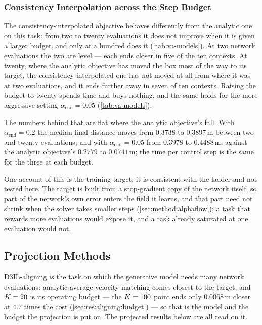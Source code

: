 \subsubsection{Consistency Interpolation across the Step Budget}\label{sec:res:aligning:consistency}

The consistency-interpolated objective behaves differently from the analytic one on this task: from two to twenty
evaluations it does not improve when it is given a larger budget, and only at a hundred does it
(\autoref{tab:va-models}). At two network evaluations the two are level --- each ends
closer in five of the ten contexts. At twenty, where the analytic objective has moved the box most of the
way to its target, the consistency-interpolated one has not moved at all from where it was at two
evaluations, and it ends further away in seven of ten contexts. Raising the budget to twenty spends time and buys
nothing, and the same holds for the more aggressive setting $\alpha_{\mathrm{end}}=0.05$
(\autoref{tab:va-models}).

The numbers behind that are flat where the analytic objective's fall. With
$\alpha_{\mathrm{end}}=0.2$ the median final distance moves from $0.3738$ to $0.3897$\,m between two and
twenty evaluations, and with $\alpha_{\mathrm{end}}=0.05$ from $0.3978$ to $0.4488$\,m, against the analytic
objective's $0.2779$ to $0.0741$\,m; the time per control step is the same for the three at each budget.

One account of this is the training target; it is consistent with the ladder and not tested here. The target is
built from a stop-gradient copy of the network itself, so part of the network's own error enters the field it
learns, and that part need not shrink when the solver takes smaller steps (\autoref{sec:method:alphaflow}); a
task that rewards more evaluations would expose it, and a task already saturated at one evaluation would not.

\subsection{Projection Methods}\label{sec:res:aligning:projection}

D3IL-aligning is the task on which the generative model needs many network evaluations: analytic
average-velocity matching comes closest to the target, and $K=20$ is its operating budget --- the
$K=100$ point ends only $0.0068$\,m closer at $4.7$ times the cost (\autoref{sec:res:aligning:budget})
--- so that is the model and the budget the projection is put on. The projected results below are all read
on it.

